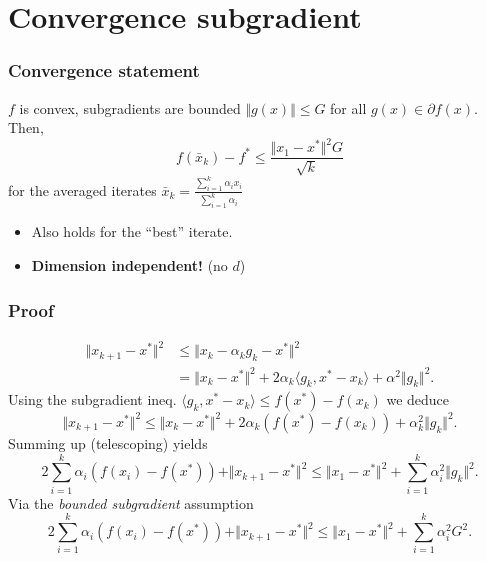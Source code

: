 \documentclass{beamer}
\begin{document}
\section{Convergence subgradient}%
\label{sec:}

\begin{frame}
  \frametitle{Convergence statement}
  \begin{theorem}
    $f$ is convex, subgradients are bounded $\Vert g(x) \Vert \le G$ for all $g(x)\in \partial f(x)$. Then,
    \begin{equation}
      f(\bar{x}_k) - f^* \le \frac{\Vert x_1-x^*\Vert^2 G}{\sqrt{k}}
    \end{equation}
    for the averaged iterates $\bar{x}_k = \frac{\sum_{i=1}^{k} \alpha_i x_i }{\sum_{i=1}^{k} \alpha_i}$
  \end{theorem}
  \begin{itemize}
    \item Also holds for the ``best'' iterate.
    \item \textbf{Dimension independent!} (no $d$)
  \end{itemize}
\end{frame}

\begin{frame}
  \frametitle{Proof}
  \vspace{-0.5cm}
  \begin{equation}
    \begin{aligned}
      \Vert x_{k+1} - x^* \Vert^2 &\le \Vert x_k - \alpha_k g_k - x^* \Vert^2 \\
      &= \Vert x_k-x^* \Vert^2 + 2 \alpha_k \langle g_k, x^*-x_k \rangle + \alpha^2 \Vert g_k \Vert^2.
    \end{aligned}
  \end{equation}
  Using the subgradient ineq. $\langle g_k , x^* -x_k \rangle \le f(x^*) - f(x_k)$
  we deduce
  \begin{equation}
    \Vert x_{k+1} - x^* \Vert^2 \le \Vert x_k-x^* \Vert^2 + 2 \alpha_k(f(x^*) - f(x_k)) + \alpha_k^2 \Vert g_k \Vert^2.
  \end{equation}
  Summing up (telescoping) yields
  \begin{equation}
    \label{eq:telescoping}
    2\sum_{i=1}^{k}  \alpha_i(f(x_i) - f(x^*)) + \Vert x_{k+1} - x^* \Vert^2 \le \Vert x_1-x^* \Vert^2 +  \sum_{i=1}^{k} \alpha_i^2 \Vert g_k \Vert^2.
  \end{equation}
  Via the \emph{bounded subgradient} assumption
  \begin{equation}
    2\sum_{i=1}^{k}  \alpha_i(f(x_i) - f(x^*)) + \Vert x_{k+1} - x^* \Vert^2 \le \Vert x_1-x^* \Vert^2 +  \sum_{i=1}^{k} \alpha_i^2 G^2.
  \end{equation}
\end{frame}
\end{document}

